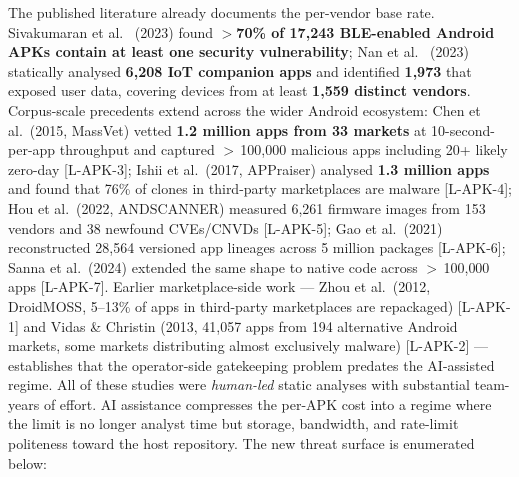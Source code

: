 \documentclass[11pt,a4paper]{article}
\begin{document}
The published literature already documents the per-vendor base rate.
Sivakumaran et al.~\citep{sivakumaran2023bleguuide} (2023) found
\textbf{$>$70\% of 17{,}243 BLE-enabled Android APKs contain at least
one security vulnerability}; Nan et al.~\citep{nan2023iotapp} (2023)
statically analysed \textbf{6{,}208 IoT companion apps} and identified
\textbf{1{,}973} that exposed user data, covering devices from at
least \textbf{1{,}559 distinct vendors}. Corpus-scale precedents
extend across the wider Android ecosystem: Chen et al.\ (2015, MassVet)
vetted \textbf{1.2 million apps from 33 markets} at 10-second-per-app
throughput and captured $>$\,100{,}000 malicious apps including 20+
likely zero-day [L-APK-3]; Ishii et al.\ (2017, APPraiser) analysed
\textbf{1.3 million apps} and found that 76\% of clones in third-party
marketplaces are malware [L-APK-4]; Hou et al.\ (2022, ANDSCANNER)
measured 6{,}261 firmware images from 153 vendors and 38 newfound
CVEs/CNVDs [L-APK-5]; Gao et al.\ (2021) reconstructed 28{,}564
versioned app lineages across 5 million packages [L-APK-6]; Sanna
et al.\ (2024) extended the same shape to native code across
$>$\,100{,}000 apps [L-APK-7]. Earlier marketplace-side work --- Zhou
et al.\ (2012, DroidMOSS, 5--13\% of apps in third-party marketplaces
are repackaged) [L-APK-1] and Vidas \& Christin (2013, 41{,}057 apps
from 194 alternative Android markets, some markets distributing almost
exclusively malware) [L-APK-2] --- establishes that the operator-side
gatekeeping problem predates the AI-assisted regime. All of these
studies were \emph{human-led} static analyses with substantial
team-years of effort. AI assistance compresses the per-APK cost into a
regime where the limit is no longer analyst time but storage,
bandwidth, and rate-limit politeness toward the host repository. The new threat surface is
enumerated below:
\end{document}

